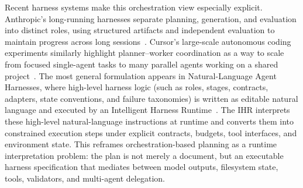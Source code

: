 \documentclass{llmxive}
\begin{document}
Recent harness systems make this orchestration view especially explicit. Anthropic's long-running harnesses separate planning, generation, and evaluation into distinct roles, using structured artifacts and independent evaluation to maintain progress across long sessions~\cite{anthropic2025longrunning,anthropic2026longrunningapps}. Cursor's large-scale autonomous coding experiments similarly highlight planner--worker coordination as a way to scale from focused single-agent tasks to many parallel agents working on a shared project~\cite{cursor2026scalingagents}. The most general formulation appears in Natural-Language Agent Harnesses, where high-level harness logic (such as roles, stages, contracts, adapters, state conventions, and failure taxonomies) is written as editable natural language and executed by an Intelligent Harness Runtime~\cite{pan2026nlah}. The IHR interprets these high-level natural-language instructions at runtime and converts them into constrained execution steps under explicit contracts, budgets, tool interfaces, and environment state. This reframes orchestration-based planning as a runtime interpretation problem: the plan is not merely a document, but an executable harness specification that mediates between model outputs, filesystem state, tools, validators, and multi-agent delegation.
\end{document}
